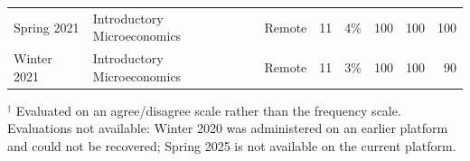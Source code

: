 \documentclass[letter,11pt]{article}
\begin{document}
\begin{table}[htbp!]
{\begin{tabular}{llllrrrr}
Spring 2021 & Introductory Microeconomics & Remote & 11 & 4\% & 100 & 100 & 100 \\
Winter 2021 & Introductory Microeconomics & Remote & 11 & 3\% & 100 & 100 & 90 \\
\bottomrule
\end{tabular}}
\par\vspace{4pt}
{\footnotesize\raggedright $^{\dagger}$ Evaluated on an agree/disagree scale rather than the frequency scale. Evaluations not available: Winter 2020 was administered on an earlier platform and could not be recovered; Spring 2025 is not available on the current platform.\par}
\end{table}
\end{document}
